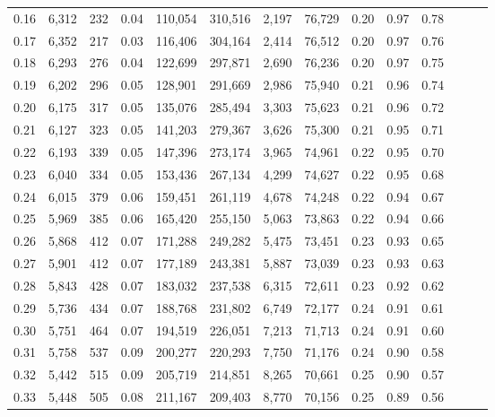 \begin{tabular}{rrrrrrrrrrrrrr}
0.16 &   6,312 &    232 &  0.04 &  110,054 &  310,516 &   2,197 &  76,729 &  0.20 &  0.97 &      0.78 \\
0.17 &   6,352 &    217 &  0.03 &  116,406 &  304,164 &   2,414 &  76,512 &  0.20 &  0.97 &      0.76 \\
0.18 &   6,293 &    276 &  0.04 &  122,699 &  297,871 &   2,690 &  76,236 &  0.20 &  0.97 &      0.75 \\
0.19 &   6,202 &    296 &  0.05 &  128,901 &  291,669 &   2,986 &  75,940 &  0.21 &  0.96 &      0.74 \\
0.20 &   6,175 &    317 &  0.05 &  135,076 &  285,494 &   3,303 &  75,623 &  0.21 &  0.96 &      0.72 \\
0.21 &   6,127 &    323 &  0.05 &  141,203 &  279,367 &   3,626 &  75,300 &  0.21 &  0.95 &      0.71 \\
0.22 &   6,193 &    339 &  0.05 &  147,396 &  273,174 &   3,965 &  74,961 &  0.22 &  0.95 &      0.70 \\
0.23 &   6,040 &    334 &  0.05 &  153,436 &  267,134 &   4,299 &  74,627 &  0.22 &  0.95 &      0.68 \\
0.24 &   6,015 &    379 &  0.06 &  159,451 &  261,119 &   4,678 &  74,248 &  0.22 &  0.94 &      0.67 \\
0.25 &   5,969 &    385 &  0.06 &  165,420 &  255,150 &   5,063 &  73,863 &  0.22 &  0.94 &      0.66 \\
0.26 &   5,868 &    412 &  0.07 &  171,288 &  249,282 &   5,475 &  73,451 &  0.23 &  0.93 &      0.65 \\
0.27 &   5,901 &    412 &  0.07 &  177,189 &  243,381 &   5,887 &  73,039 &  0.23 &  0.93 &      0.63 \\
0.28 &   5,843 &    428 &  0.07 &  183,032 &  237,538 &   6,315 &  72,611 &  0.23 &  0.92 &      0.62 \\
0.29 &   5,736 &    434 &  0.07 &  188,768 &  231,802 &   6,749 &  72,177 &  0.24 &  0.91 &      0.61 \\
0.30 &   5,751 &    464 &  0.07 &  194,519 &  226,051 &   7,213 &  71,713 &  0.24 &  0.91 &      0.60 \\
0.31 &   5,758 &    537 &  0.09 &  200,277 &  220,293 &   7,750 &  71,176 &  0.24 &  0.90 &      0.58 \\
0.32 &   5,442 &    515 &  0.09 &  205,719 &  214,851 &   8,265 &  70,661 &  0.25 &  0.90 &      0.57 \\
0.33 &   5,448 &    505 &  0.08 &  211,167 &  209,403 &   8,770 &  70,156 &  0.25 &  0.89 &      0.56 \\

\end{tabular}
